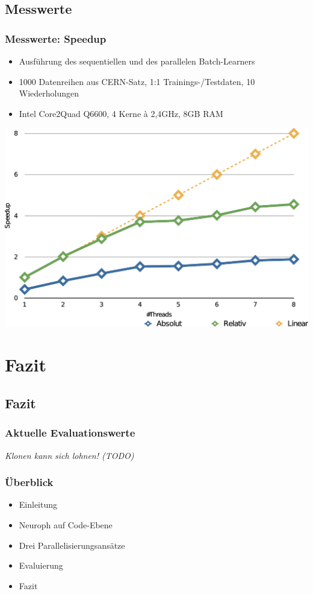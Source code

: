 \documentclass[18pt]{beamer}
\begin{document}
	
	\subsection{Messwerte}

	\begin{frame}\frametitle{Messwerte: Speedup}
		\begin{block}{}
			\begin{itemize}
				\item Ausführung des sequentiellen und des parallelen Batch-Learners
				\item 1000 Datenreihen aus CERN-Satz, 1:1 Trainings-/Testdaten, 10 Wiederholungen
				\item Intel Core2Quad Q6600, 4 Kerne à 2,4GHz, 8GB RAM
			\end{itemize}
		\end{block}
		\begin{center}
			\includegraphics[scale=0.33]{Grafiken/batch_speedup.pdf}
		\end{center}
	\end{frame}
	
	\section{Fazit}
	\subsection{Fazit}
	\begin{frame}\frametitle{Aktuelle Evaluationswerte}
		\textit{Klonen kann sich lohnen! (TODO)}
	\end{frame}
	
	\begin{frame}[c]\frametitle{Überblick}
		\begin{itemize}
		   \item Einleitung \checkmark
		   \item Neuroph auf Code-Ebene \checkmark
		   \item Drei Parallelisierungsansätze \checkmark
		   \item Evaluierung \checkmark
		   \item Fazit
		\end{itemize}
	\end{frame}
\end{document}
